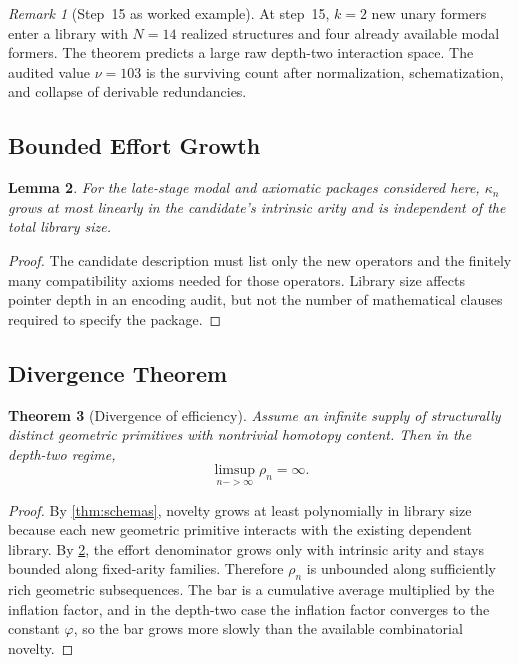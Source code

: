 \documentclass[11pt,a4paper]{article}
\def\to{->}%
\theoremstyle{plain}
\newtheorem{theorem}{Theorem}[section]
\newtheorem{lemma}[theorem]{Lemma}
\theoremstyle{definition}
\theoremstyle{remark}
\newtheorem{remark}[theorem]{Remark}
\begin{document}
\begin{remark}[Step~15 as worked example]
\label{rem:step15-synthesis}
At step~15, $k=2$ new unary formers enter a library with $N=14$ realized structures and four already available modal formers.  The theorem predicts a large raw depth-two interaction space.  The audited value $\nu=103$ is the surviving count after normalization, schematization, and collapse of derivable redundancies.
\end{remark}

\subsection{Bounded Effort Growth}

\begin{lemma}
\label{lem:bounded-effort}
For the late-stage modal and axiomatic packages considered here, $\kappa_n$ grows at most linearly in the candidate's intrinsic arity and is independent of the total library size.
\end{lemma}

\begin{proof}
The candidate description must list only the new operators and the finitely many compatibility axioms needed for those operators.  Library size affects pointer depth in an encoding audit, but not the number of mathematical clauses required to specify the package.
\end{proof}

\subsection{Divergence Theorem}

\begin{theorem}[Divergence of efficiency]
\label{thm:divergence}
Assume an infinite supply of structurally distinct geometric primitives with nontrivial homotopy content.  Then in the depth-two regime,
\[
  \limsup_{n\to\infty}\rho_n=\infty.
\]
\end{theorem}

\begin{proof}
By \cref{thm:schemas}, novelty grows at least polynomially in library size because each new geometric primitive interacts with the existing dependent library.  By \cref{lem:bounded-effort}, the effort denominator grows only with intrinsic arity and stays bounded along fixed-arity families.  Therefore $\rho_n$ is unbounded along sufficiently rich geometric subsequences.  The bar is a cumulative average multiplied by the inflation factor, and in the depth-two case the inflation factor converges to the constant $\varphi$, so the bar grows more slowly than the available combinatorial novelty.
\end{proof}
\end{document}
